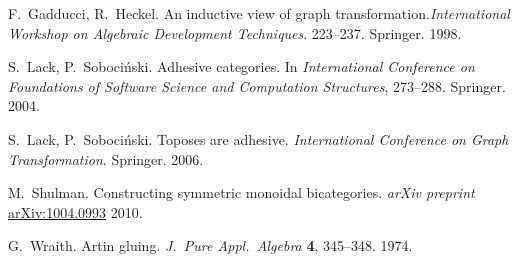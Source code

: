 \documentclass{amsart}
\theoremstyle{remark}
\theoremstyle{definition}
\begin{document}
\begin{thebibliography}{99}
 F.\ Gadducci, R.\ Heckel. An
  inductive view of graph transformation.\emph{International
    Workshop on Algebraic Development
    Techniques}. 223--237. Springer. 1998.

  
 S.\ Lack, P.\
  Soboci\'{n}ski. Adhesive categories. In
  \emph{International Conference on Foundations of Software
    Science and Computation Structures},
  273--288. Springer. 2004.

 S.~Lack,
  P.~Soboci\'{n}ski. Toposes are
  adhesive. \emph{International Conference on Graph
    Transformation}. Springer. 2006.

 M.~Shulman. Constructing symmetric
  monoidal bicategories. \emph{arXiv preprint}
  \href{https://arxiv.org/abs/1004.0993}{arXiv:1004.0993}
  2010.
  
 G.\ Wraith. Artin
  gluing. \emph{J.\ Pure Appl.\ Algebra} \textbf{4},
  345--348. 1974.

\end{thebibliography}
\end{document}

